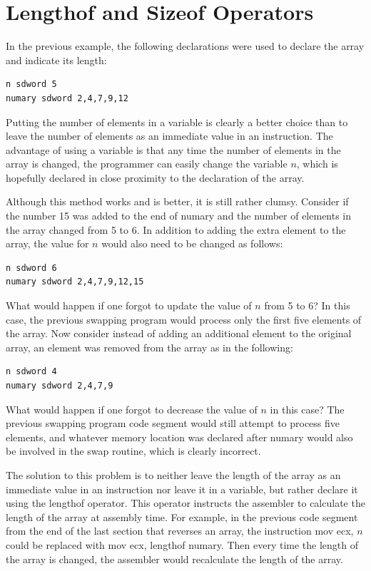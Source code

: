 \documentclass[10pt]{book}
\begin{document}
\section{Lengthof and Sizeof Operators}
In the previous example, the following declarations were used to declare the array and indicate its length:

\begin{verbatim}
n sdword 5
numary sdword 2,4,7,9,12
\end{verbatim}

Putting the number of elements in a variable is clearly a better choice than to leave the number of elements as an immediate value in an instruction. The advantage of using a variable is that any time the number of elements in the array is changed, the programmer can easily change the variable $n$, which is hopefully declared in close proximity to the declaration of the array.

Although this method works and is better, it is still rather clumsy. Consider if the number 15 was added to the end of numary and the number of elements in the array changed from 5 to 6. In addition to adding the extra element to the array, the value for $n$ would also need to be changed as follows:
\begin{verbatim}
n sdword 6
numary sdword 2,4,7,9,12,15
\end{verbatim}

What would happen if one forgot to update the value of $n$ from 5 to 6? In this case, the previous swapping program would process only the first five elements of the array. Now consider instead of adding an additional element to the original array, an element was removed from the array as in the following:

\begin{verbatim}
n sdword 4
numary sdword 2,4,7,9
\end{verbatim}

What would happen if one forgot to decrease the value of $n$ in this case? The previous swapping program code segment would still attempt to process five elements, and whatever memory location was declared after numary would also be involved in the swap routine, which is clearly incorrect.

The solution to this problem is to neither leave the length of the array as an immediate value in an instruction nor leave it in a variable, but rather declare it using the lengthof operator. This operator instructs the assembler to calculate the length of the array at assembly time. For example, in the previous code segment from the end of the last section that reverses an array, the instruction mov ecx, $n$ could be replaced with mov ecx, lengthof numary. Then every time the length of the array is changed, the assembler would recalculate the length of the array.
\end{document}
